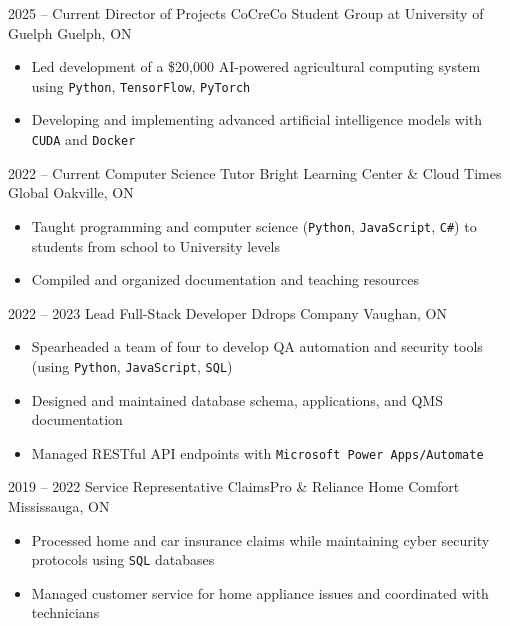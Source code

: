 \documentclass[9pt]{src/developercv} %
\begin{document}
	\begin{entrylist}
		\atsentry
			{2025 -- Current}
			{Director of Projects}
			{CoCreCo Student Group at University of Guelph}
			{Guelph, ON}
			{
				\vspace{-1.0\baselineskip}
				\begin{itemize}
					\item Led development of a \$20,000 AI-powered agricultural computing system using \texttt{Python}, \texttt{TensorFlow}, \texttt{PyTorch}
					\item Developing and implementing advanced artificial intelligence models with \texttt{CUDA} and \texttt{Docker}
				\end{itemize}
			}
		\atsentry
			{2022 -- Current}
			{Computer Science Tutor}
			{Bright Learning Center \& Cloud Times Global}
			{Oakville, ON}
			{
				\vspace{-1.0\baselineskip}
				\begin{itemize}
					\item Taught programming and computer science (\texttt{Python}, \texttt{JavaScript}, \texttt{C\#}) to students from school to University levels
					\item Compiled and organized documentation and teaching resources
				\end{itemize}
			}
		\atsentry
			{2022 -- 2023}
			{Lead Full-Stack Developer}
			{Ddrops Company}
			{Vaughan, ON}
			{
				\vspace{-1.0\baselineskip}
				\begin{itemize}
					\item Spearheaded a team of four to develop QA automation and security tools (using \texttt{Python}, \texttt{JavaScript}, \texttt{SQL})
					\item Designed and maintained database schema, applications, and QMS documentation
					\item Managed RESTful API endpoints with \texttt{Microsoft Power Apps/Automate}
				\end{itemize}
			}
		\atsentry
			{2019 -- 2022}
			{Service Representative}
			{ClaimsPro \& Reliance Home Comfort}
			{Mississauga, ON}
			{
				\vspace{-1.0\baselineskip}
				\begin{itemize}
					\item Processed home and car insurance claims while maintaining cyber security protocols using \texttt{SQL} databases
					\item Managed customer service for home appliance issues and coordinated with technicians

\end{itemize}}
\end{entrylist}
\end{document}
